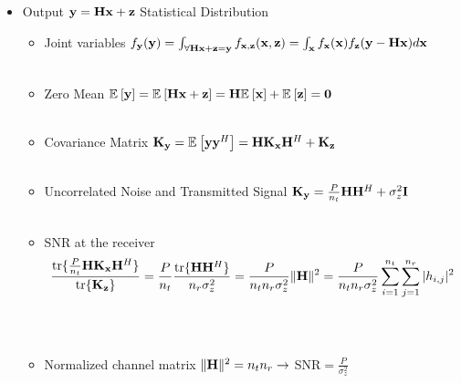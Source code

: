 \documentclass[xcolor=dvipsnames,aspectratio=169]{beamer}
\begin{document}
{\begin{itemize}
\begin{itemize}
$${\begin{array}{cccc}
                                               \end{array} \right)}$$
        \item I.I.D. Transmitted Signal $\Ex{}{x_2x_1^*}=0\Rightarrow \K_{\x}=\frac{P}{n_t}\I$\\ \ \\
        \item Example: Select $x_i$ from $n_t$ independent QPSK constellations.\\ \ \\
    \end{itemize}
    \pagebreak
    \item Output $\mathbf{y}=\mathbf{H} \mathbf{x} +\mathbf{z}$ Statistical Distribution
    \begin{itemize}
        \item Joint variables $f_{\mathbf{y}}(\mathbf{y})=\int_{\forall \mathbf{H}\mathbf{x}+\mathbf{z}=\mathbf{y}}f_{\mathbf{x},\mathbf{z}}(\mathbf{x},\mathbf{z})=\int_{\mathbf{x}} f_{\mathbf{x}}(\mathbf{x})f_{\mathbf{z}}(\mathbf{y}-\mathbf{H}\mathbf{x})d\mathbf{x}$ \\ \ \\
        \item Zero Mean ${\mathbb{E}_{}\left[\mathbf{y}\right]}={\mathbb{E}_{}\left[\mathbf{H}\mathbf{x}+\mathbf{z}\right]}=\mathbf{H}{\mathbb{E}_{}\left[\mathbf{x}\right]}+{\mathbb{E}_{}\left[\mathbf{z}\right]}=\mathbf{0}$\\ \ \\
        \item Covariance Matrix $\mathbf{K}_{\mathbf{y}}={\mathbb{E}_{}\left[\mathbf{y} \mathbf{y}^H\right]}=\mathbf{H}\mathbf{K}_{\mathbf{x}}\mathbf{H}^H+\mathbf{K}_{\mathbf{z}}$\\ \ \\
        \item Uncorrelated Noise and Transmitted Signal $\mathbf{K}_{\mathbf{y}}=\frac{P}{n_t}\mathbf{H}\mathbf{H}^H+\sigma_z^2\mathbf{I}$\\ \ \\
        \item SNR at the receiver 
        $$\frac{\textnormal{tr}\{\frac{P}{n_t}\mathbf{H}\mathbf{K}_{\mathbf{x}}\mathbf{H}^H\}}{\textnormal{tr}\{\mathbf{K}_{\mathbf{z}}\}}=\frac{P}{n_t}\frac{\textnormal{tr}\{\mathbf{H}\mathbf{H}^H\}}{n_r\sigma_z^2}=\frac{P}{n_tn_r\sigma_z^2}\|\mathbf{H}\|^2=\frac{P}{n_tn_r\sigma_z^2}\sum_{i=1}^{n_t}\sum_{j=1}^{n_r}|h_{i,j}|^2$$\\ \ \\
        \item Normalized channel matrix $\|\mathbf{H}\|^2=n_tn_r\to$ SNR$=\frac{P}{\sigma_z^2}$
    \end{itemize}
 \end{itemize}
}
\end{document}
